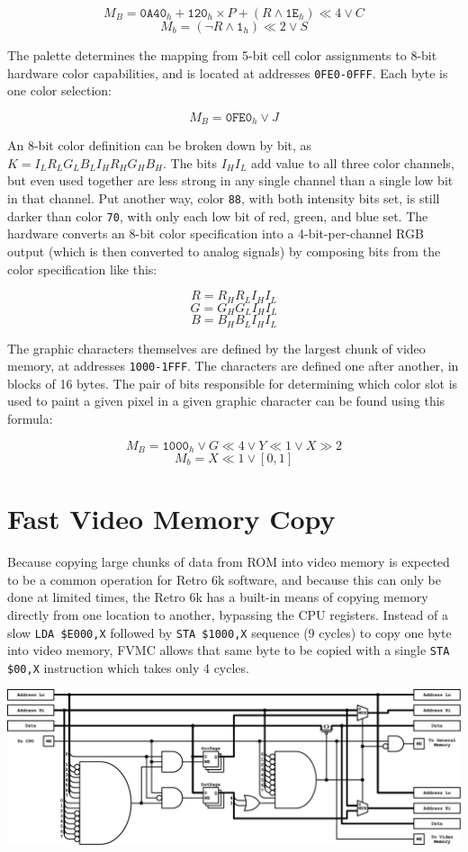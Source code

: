\documentclass[12pt]{{memoir}}
\begin{document}
$$M_B = \texttt{0A40}_h + \texttt{120}_h \times P + (R \wedge \texttt{1E}_h) \ll 4 \vee C$$
$$M_b = (\lnot{R} \wedge \texttt{1}_h) \ll 2 \vee S$$

The palette determines the mapping from 5-bit cell color assignments to 8-bit hardware color capabilities, and is located at addresses \texttt{0FE0-0FFF}. Each byte is one color selection:

$$M_B = \texttt{0FE0}_h \vee J$$

An 8-bit color definition can be broken down by bit, as $K = I_LR_LG_LB_LI_HR_HG_HB_H$. The bits $I_HI_L$ add value to all three color channels, but even used together are less strong in any single channel than a single low bit in that channel. Put another way, color \texttt{88}, with both intensity bits set, is still darker than color \texttt{70}, with only each low bit of red, green, and blue set. The hardware converts an 8-bit color specification into a 4-bit-per-channel RGB output (which is then converted to analog signals) by composing bits from the color specification like this:

$$R = R_HR_LI_HI_L$$
$$G = G_HG_LI_HI_L$$
$$B = B_HB_LI_HI_L$$

The graphic characters themselves are defined by the largest chunk of video memory, at addresses \texttt{1000-1FFF}. The characters are defined one after another, in blocks of 16 bytes. The pair of bits responsible for determining which color slot is used to paint a given pixel in a given graphic character can be found using this formula:

$$M_B = \texttt{1000}_h \vee G \ll 4 \vee Y \ll 1 \vee X \gg 2$$
$$M_b = X \ll 1 \vee [0,1]$$

\section{Fast Video Memory Copy}
\label{sec:fvmc}

Because copying large chunks of data from ROM into video memory is expected to be a common operation for Retro 6k software, and because this can only be done at limited times, the Retro 6k has a built-in means of copying memory directly from one location to another, bypassing the CPU registers. Instead of a slow \texttt{LDA \$E000,X} followed by \texttt{STA \$1000,X} sequence (9 cycles) to copy one byte into video memory, FVMC allows that same byte to be copied with a single \texttt{STA \$00,X} instruction which takes only 4 cycles.

\begin{center}\includegraphics[width=\textwidth]{fvmc}\end{center}
\end{document}
